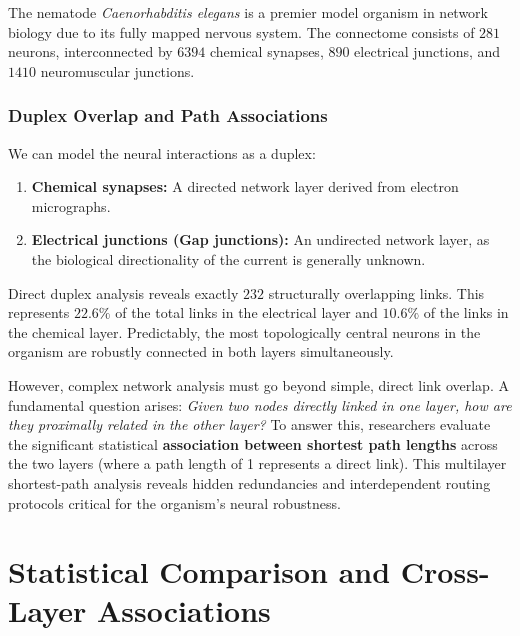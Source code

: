 The nematode \textit{Caenorhabditis elegans} is a premier model organism in network biology due to its fully mapped nervous system. The connectome consists of \(281\) neurons, interconnected by \(6394\) chemical synapses, \(890\) electrical junctions, and \(1410\) neuromuscular junctions.


\subsubsection{Duplex Overlap and Path Associations}
\label{subsubsec:celegans_overlap}

We can model the neural interactions as a duplex:
\begin{enumerate}
    \item \textbf{Chemical synapses:} A directed network layer derived from electron micrographs.
    \item \textbf{Electrical junctions (Gap junctions):} An undirected network layer, as the biological directionality of the current is generally unknown.
\end{enumerate}

Direct duplex analysis reveals exactly \(232\) structurally overlapping links. This represents \(22.6\%\) of the total links in the electrical layer and \(10.6\%\) of the links in the chemical layer. Predictably, the most topologically central neurons in the organism are robustly connected in both layers simultaneously.

However, complex network analysis must go beyond simple, direct link overlap. A fundamental question arises: \textit{Given two nodes directly linked in one layer, how are they proximally related in the other layer?} To answer this, researchers evaluate the significant statistical \textbf{association between shortest path lengths} across the two layers (where a path length of 1 represents a direct link). This multilayer shortest-path analysis reveals hidden redundancies and interdependent routing protocols critical for the organism's neural robustness.

\section{Statistical Comparison and Cross-Layer Associations}
\label{sec:cross_layer_associations}

